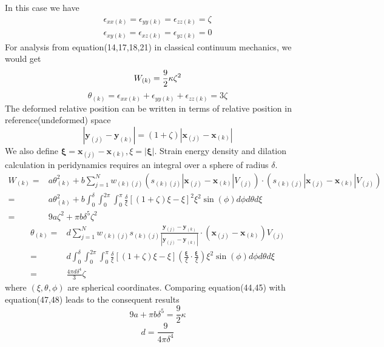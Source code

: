 \documentclass[a4paper,11pt,CJK]{paper}
\newcommand{\bfxj}{\textbf{x}_{(j)}}
\newcommand{\bfyj}{\textbf{y}_{(j)}}
\newcommand{\bfxk}{\textbf{x}_{(k)}}
\newcommand{\bfyk}{\textbf{y}_{(k)}}
\newcommand{\wkj}{w_{(k)(j)}}
\newcommand{\skj}{s_{(k)(j)}}
\newcommand{\thetak}{\theta_{(k)}}
\begin{document}
In this case we have
\begin{eqnarray}
  \epsilon_{xx(k)} =  \epsilon_{yy(k)} = \epsilon_{zz(k)} = \zeta\\
  \epsilon_{xy(k)} =  \epsilon_{xz(k)} = \epsilon_{yz(k)} = 0
\end{eqnarray}
For analysis from equation(14,17,18,21) in classical continuum mechanics, we would get
\begin{equation}
W_{(k)} = \frac{9}{2}\kappa\zeta^2\\
\end{equation}
\begin{equation}
\thetak = \epsilon_{xx(k)}+\epsilon_{yy(k)}+\epsilon_{zz(k)} = 3\zeta
\end{equation}
The deformed relative position can be written in terms of relative position in reference(undeformed) space
\begin{equation}
|\bfyj - \bfyk| = (1+\zeta)|\bfxj - \bfxk|
\end{equation}
We also define $\bm{\xi} = \bfxj - \bfxk, \xi = |\bm{\xi}|$.
Strain energy density and dilation calculation in peridynamics requires an integral over a sphere of radius $\delta$.
\begin{equation}
\begin{aligned}
W_{(k)} =& a\thetak^2
           +b\sum_{j=1}^{N}\wkj(\skj|\bfxj-\bfxk|V_{(j)})\cdot(\skj|\bfxj-\bfxk|V_{(j)})\\
        =& a\thetak^2
           +b\int_0^\delta\int_0^{2\pi}\int_0^{\pi}\frac{\delta}{\xi}\left[(1+\zeta)\xi-\xi\right]^2\xi^2\sin(\phi)d\phi d\theta d\xi\\
        =& 9a\zeta^2+\pi b\delta^5\zeta^2
\end{aligned}
\end{equation}
\begin{equation}
\begin{aligned}
\thetak =& d\sum_{j=1}^{N}\wkj\skj\frac{\bfyj - \bfyk}{|\bfyj - \bfyk|}\cdot(\bfxj-\bfxk)V_{(j)}\\
        =& d\int_0^\delta\int_0^{2\pi}\int_0^{\pi}\frac{\delta}{\xi}\left[(1+\zeta)\xi-\xi\right](\frac{\bm{\xi}}{\xi}\cdot\frac{\bm{\xi}}{\xi})\xi^2\sin(\phi)d\phi d\theta d\xi\\
        =& \frac{4\pi d\delta^4}{3}\zeta
\end{aligned}
\end{equation}
where $(\xi,\theta,\phi)$ are spherical coordinates. Comparing equation(44,45) with equation(47,48) leads to the consequent results
\begin{equation}
9a + \pi b\delta^5 = \frac{9}{2}\kappa
\end{equation}
\begin{equation}
d = \frac{9}{4\pi\delta^4}
\end{equation}
\end{document}
